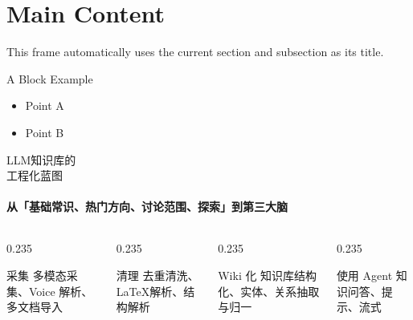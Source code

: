 \documentclass[aspectratio=169]{beamer}
\newenvironment{autoframe}
  {\begin{frame}{\insertsection}{\insertsubsection}}
  {\end{frame}}
\begin{document}
\section{Main Content}
\begin{autoframe}
    This frame automatically uses the current section and subsection as its title.
    \begin{block}{A Block Example}
        \begin{itemize}
            \item Point A
            \item Point B
        \end{itemize}
    \end{block}
\end{autoframe}

\begin{frame}{LLM知识库的\\工程化蓝图}
    \framesubtitle{从「基础常识、热门方向、讨论范围、探索」到第三大脑}
    \vspace{3pt}
    \begin{columns}[t,onlytextwidth]
        \begin{column}{0.235\textwidth}
            \begin{block}{采集}
                \scriptsize 多模态采集、Voice 解析、多文档导入
            \end{block}
        \end{column}
        \begin{column}{0.235\textwidth}
            \begin{block}{清理}
                \scriptsize 去重清洗、\LaTeX 解析、结构解析
            \end{block}
        \end{column}
        \begin{column}{0.235\textwidth}
            \begin{alertblock}{Wiki 化}
                \scriptsize 知识库结构化、实体、关系抽取与归一
            \end{alertblock}
        \end{column}
        \begin{column}{0.235\textwidth}
            \begin{block}{使用}
                \scriptsize Agent 知识问答、提示、流式
            \end{block}
        \end{column}
    \end{columns}
\end{frame}
\end{document}
